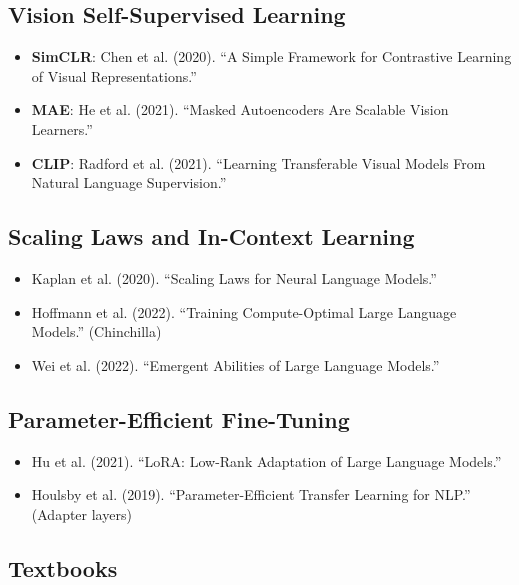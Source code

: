 \documentclass{article}
\begin{document}
\subsection{Vision Self-Supervised Learning}

\begin{itemize}
\item \textbf{SimCLR}: Chen et al. (2020). ``A Simple Framework for Contrastive Learning of Visual Representations.''

\item \textbf{MAE}: He et al. (2021). ``Masked Autoencoders Are Scalable Vision Learners.''

\item \textbf{CLIP}: Radford et al. (2021). ``Learning Transferable Visual Models From Natural Language Supervision.''
\end{itemize}

\subsection{Scaling Laws and In-Context Learning}

\begin{itemize}
\item Kaplan et al. (2020). ``Scaling Laws for Neural Language Models.''

\item Hoffmann et al. (2022). ``Training Compute-Optimal Large Language Models.'' (Chinchilla)

\item Wei et al. (2022). ``Emergent Abilities of Large Language Models.''
\end{itemize}

\subsection{Parameter-Efficient Fine-Tuning}

\begin{itemize}
\item Hu et al. (2021). ``LoRA: Low-Rank Adaptation of Large Language Models.''

\item Houlsby et al. (2019). ``Parameter-Efficient Transfer Learning for NLP.'' (Adapter layers)
\end{itemize}

\subsection{Textbooks}
\end{document}
